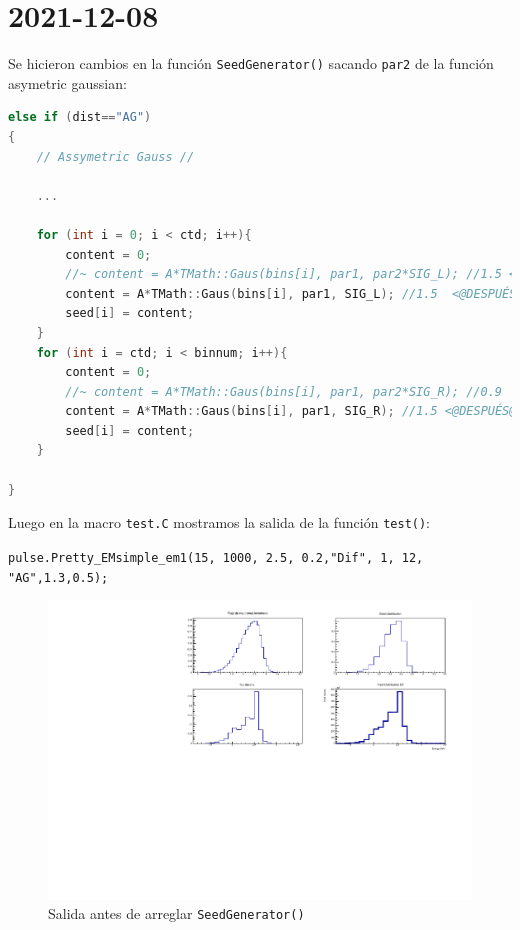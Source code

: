 \documentclass[11pt,letterpaper]{article}
\begin{document}
\section{2021-12-08}
\label{2021-12-08}
Se hicieron cambios en la función \verb|SeedGenerator()| sacando \verb|par2| de la función asymetric gaussian:

\begin{lstlisting}[language=c++]
else if (dist=="AG")
{
	// Assymetric Gauss //

	...
	
	for (int i = 0; i < ctd; i++){
		content = 0;
		//~ content = A*TMath::Gaus(bins[i], par1, par2*SIG_L); //1.5 <@ANTES@>
		content = A*TMath::Gaus(bins[i], par1, SIG_L); //1.5  <@DESPUÉS@>
		seed[i] = content;
	}
	for (int i = ctd; i < binnum; i++){
		content = 0;
		//~ content = A*TMath::Gaus(bins[i], par1, par2*SIG_R); //0.9  <@ANTES@>
		content = A*TMath::Gaus(bins[i], par1, SIG_R); //1.5 <@DESPUÉS@>
		seed[i] = content;
	}
	
}
\end{lstlisting}

Luego en la macro \verb|test.C| mostramos la salida de la función \verb|test()|:

 \verb|pulse.Pretty_EMsimple_em1(15, 1000, 2.5, 0.2,"Dif", 1, 12, "AG",1.3,0.5);|

\begin{figure}[H]
    \includegraphics[width=1\textwidth]{img/antes_de_arreglar_Seed.pdf}
    \centering
    \cprotect\caption{Salida antes de arreglar \verb|SeedGenerator()| }
\end{figure}
\end{document}
